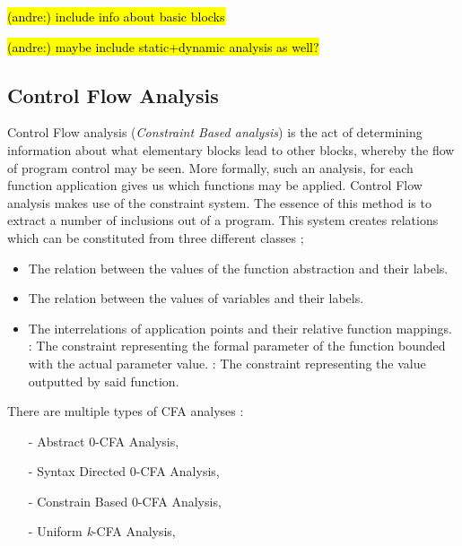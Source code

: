 \documentclass[12pt, a4paper]{report}
\DeclareRobustCommand{\andre}[1]{ {\begingroup\sethlcolor{BurntOrange}\hl{(andre:) #1}\endgroup} }
\theoremstyle{definition}
\theoremstyle{definition}%
\theoremstyle{definition}%
\theoremstyle{definition}%
\theoremstyle{definition}%
\theoremstyle{definition}%
\begin{document}
{    \par \andre{include info about basic blocks}
    \par \andre{maybe include static+dynamic analysis as well?}

    \subsection{Control Flow Analysis}
    \label{subsec:cfa}
    \par Control Flow analysis (\textit{Constraint Based analysis}) is the act of determining information about what elementary blocks lead to other blocks, whereby the flow of program control may be seen. More formally, such an analysis, for each 
    function application gives us which functions may be applied. Control Flow analysis makes use of the constraint system. The essence of this method is to extract a number of inclusions out of a program. This system creates relations which can be 
    constituted from three different classes \cite[pp.10--13]{nielson2004principlesofPA};
    \begin{itemize}
        \item The relation between the values of the function abstraction and their labels.
        \item The relation between the values of variables and their labels.
        \item The interrelations of application points and their relative function mappings.
            : The constraint representing the formal parameter of the function bounded with the actual parameter value.
            : The constraint representing the value outputted by said function.
    \end{itemize}
    \par There are multiple types of CFA analyses \cite[pp.139--195]{nielson2004principlesofPA}:
    \begin{itemize}
        \item[-] Abstract 0-CFA Analysis,
        \item[-] Syntax Directed 0-CFA Analysis,
        \item[-] Constrain Based 0-CFA Analysis,
        \item[-] Uniform \textit{k}-CFA Analysis,
    \end{itemize}
    
}
\end{document}
